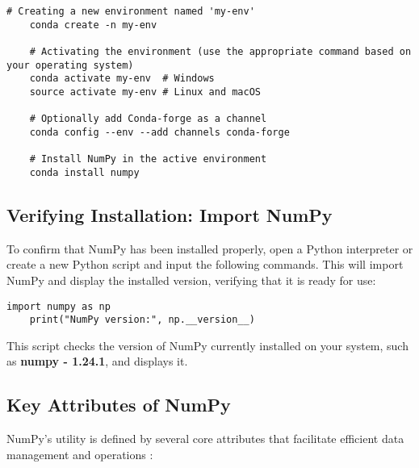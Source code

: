 \begin{lstlisting}[caption={Example commands to create a Conda environment and install NumPy}, label={code:conda-numpy-install}, style=pythonstyle]
	# Creating a new environment named 'my-env'
	conda create -n my-env
	
	# Activating the environment (use the appropriate command based on your operating system)
	conda activate my-env  # Windows
	source activate my-env # Linux and macOS
	
	# Optionally add Conda-forge as a channel
	conda config --env --add channels conda-forge
	
	# Install NumPy in the active environment
	conda install numpy
\end{lstlisting}


\subsection{Verifying Installation: Import NumPy}

To confirm that NumPy has been installed properly, open a Python interpreter or create a new Python script and input the following commands. This will import NumPy and display the installed version, verifying that it is ready for use:

\begin{lstlisting}[caption={Example code to print the installed NumPy version}, label={code:numpy-version}, style=pythonstyle]
	import numpy as np
	print("NumPy version:", np.__version__)
\end{lstlisting}


This script checks the version of NumPy currently installed on your system, such as \textbf{numpy - 1.24.1}, and displays it.

\subsection{Key Attributes of NumPy}

NumPy's utility is defined by several core attributes that facilitate efficient data management and operations \cite{NumPy:2024}:

